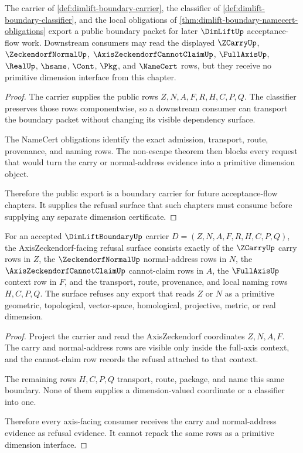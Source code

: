 \begin{theorem}
\label{thm:dimlift-boundary-public-export}
The carrier of \autoref{def:dimlift-boundary-carrier}, the classifier of \autoref{def:dimlift-boundary-classifier}, and the local obligations of \autoref{thm:dimlift-boundary-namecert-obligations} export a public boundary packet for later $\DimLiftUp$ acceptance-flow work. Downstream consumers may read the displayed $\ZCarryUp$, $\ZeckendorfNormalUp$, $\AxisZeckendorfCannotClaimUp$, $\FullAxisUp$, $\RealUp$, $\hsame$, $\Cont$, $\Pkg$, and $\NameCert$ rows, but they receive no primitive dimension interface from this chapter.
\end{theorem}
\begin{proof}
The carrier supplies the public rows $Z,N,A,F,R,H,C,P,Q$. The classifier preserves those rows componentwise, so a downstream consumer can transport the boundary packet without changing its visible dependency surface.

The NameCert obligations identify the exact admission, transport, route, provenance, and naming rows. The non-escape theorem then blocks every request that would turn the carry or normal-address evidence into a primitive dimension object.

Therefore the public export is a boundary carrier for future acceptance-flow chapters. It supplies the refusal surface that such chapters must consume before supplying any separate dimension certificate.
\end{proof}

\begin{theorem}
\label{thm:dimliftboundary-axis-refusal-obligations}
For an accepted $\DimLiftBoundaryUp$ carrier $D=(Z,N,A,F,R,H,C,P,Q)$, the AxisZeckendorf-facing refusal surface consists exactly of the $\ZCarryUp$ carry rows in $Z$, the $\ZeckendorfNormalUp$ normal-address rows in $N$, the $\AxisZeckendorfCannotClaimUp$ cannot-claim rows in $A$, the $\FullAxisUp$ context row in $F$, and the transport, route, provenance, and local naming rows $H,C,P,Q$. The surface refuses any export that reads $Z$ or $N$ as a primitive geometric, topological, vector-space, homological, projective, metric, or real dimension.
\end{theorem}
\begin{proof}
Project the carrier and read the AxisZeckendorf coordinates $Z,N,A,F$. The carry and normal-address rows are visible only inside the full-axis context, and the cannot-claim row records the refusal attached to that context.

The remaining rows $H,C,P,Q$ transport, route, package, and name this same boundary. None of them supplies a dimension-valued coordinate or a classifier into one.

Therefore every axis-facing consumer receives the carry and normal-address evidence as refusal evidence. It cannot repack the same rows as a primitive dimension interface.
\end{proof}

